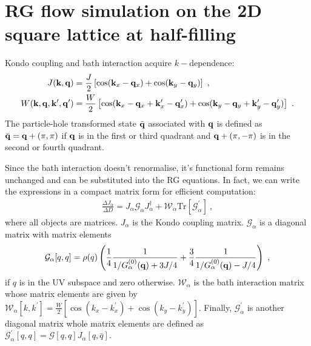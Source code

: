 \documentclass[%
reprint,
superscriptaddress,
groupedaddress,
superscriptaddress,
onecolumn,
10pt
]{revtex4-2}
\begin{document}
\section{RG flow simulation on the 2D square lattice at half-filling}
Kondo coupling and bath interaction acquire \(k-\)dependence:
\begin{equation}\begin{aligned}
	J({\bf k}, {\bf q}) &= \frac{J}{2}\left[\cos({\bf k}_x - {\bf q}_x) + \cos({\bf k}_y - {\bf q}_y)\right]~,\\
	W({\bf k}, {\bf q}, {\bf k}^\prime, {\bf q}^\prime) &= \frac{W}{2}\left[\cos({\bf k}_x - {\bf q}_x + {\bf k}^\prime_x - {\bf q}^\prime_x) + \cos({\bf k}_y - {\bf q}_y + {\bf k}^\prime_y - {\bf q}^\prime_y)\right]~.
\end{aligned}\end{equation}
The particle-hole transformed state \(\bar{\bf q}\) associated with \({\bf q}\) is defined as \(\bar {\bf q} = {\bf q} + \left(\pi, \pi\right)\) if \({\bf q}\) is in the first or third quadrant and \({\bf q} + \left(\pi, -\pi\right)\) is in the second or fourth quadrant.

Since the bath interaction doesn't renormalise, it's functional form remains unchanged and can be substituted into the RG equations. In fact, we can write the expressions in a compact matrix form for efficient computation:
\begin{equation}\begin{aligned}
	\frac{\Delta J_\alpha}{\Delta D} = J_\alpha \mathcal{G}_\alpha J_\alpha^\dagger + \mathcal{W}_\alpha\text{Tr}\left[\mathcal{G}^\prime_\alpha\right]~,
\end{aligned}\end{equation}
where all objects are matrices. \(J_\alpha\) is the Kondo coupling matrix. \(\mathcal{G}_\alpha\) is a diagonal matrix with matrix elements 
\begin{equation}\begin{aligned}
\mathcal{G}_\alpha[q, q] = \rho(q) \left(\frac{1}{4}\frac{1}{1/G_\alpha^{(0)}({\bf q}) + 3J/4} + \frac{3}{4}\frac{1}{1/G_\alpha^{(0)}({\bf q}) - J/4}\right)~,
\end{aligned}\end{equation}
if \(q\) is in the UV subspace and zero otherwise. \(\mathcal{W}_\alpha\) is the bath interaction matrix whose matrix elements are given by \(\mathcal{W}_\alpha[k, k^\prime] = \frac{W}{2}\left[\cos(k_x - k^\prime_x) + \cos(k_y - k^\prime_y)\right]\). Finally, \(\mathcal{G}^\prime_\alpha\) is another diagonal matrix whole matrix elements are defined as \(\mathcal{G}^\prime_\alpha[q,q] = \mathcal{G}[q, q] J_\alpha[q,\bar q]\).
\end{document}
